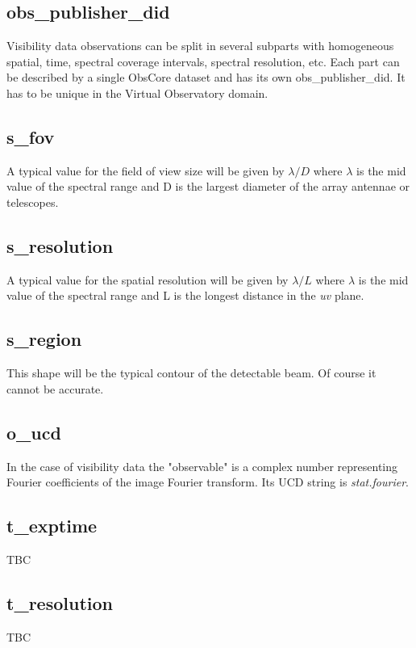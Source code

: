 \documentclass[11pt,a4paper]{ivoa}
\begin{document}
\subsection{obs\_publisher\_did}

Visibility data observations can be split in several subparts with homogeneous spatial, 
time, spectral coverage intervals, spectral resolution, etc. Each part can be described by 
a single ObsCore dataset and has its own obs\_publisher\_did. It has to be unique in the 
Virtual Observatory domain.

\subsection{s\_fov}
\label{sec:fov}

A typical value for the field of view size will be given by $\lambda / D$ where $\lambda$ 
is the mid value of the spectral range and D is the largest diameter of the array antennae or 
telescopes.
 
\subsection{s\_resolution}
\label{sec:res}

A typical value for the spatial resolution will be given by $\lambda / L$ where $\lambda$ 
is the mid value of the spectral range and L is the longest distance in the \emph{uv} plane. 

\subsection{s\_region}

This shape will be the typical contour of the detectable beam. Of course it cannot be accurate. 

\subsection{o\_ucd}

In the case of visibility data the "observable" is a complex number representing Fourier 
coefficients of the image Fourier transform. Its UCD string is \emph{stat.fourier}. 

\subsection{t\_exptime}
TBC

\subsection{t\_resolution}
TBC 
\end{document}
